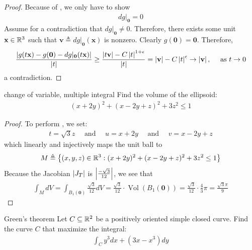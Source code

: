 \documentclass{report}
\begin{document}
\begin{proof}
 Because of , we only have to show 
\begin{align*}
dg |_\textbf{0}= 0
\end{align*}
Assume for a contradiction that $dg|_\textbf{0}\neq 0$. Therefore, there exists some unit $\textbf{x}\in\mathbb{R}^3$ such that $\textbf{v}\triangleq dg|_\textbf{0}(\textbf{x})$ is nonzero. Clearly $g(\textbf{0})=\textbf{0}$. Therefore, 
\begin{align*}
 \frac{\left|g(t\textbf{x})- g(\textbf{0})- dg|_\textbf{0}(t \textbf{x})\right|}{\left|t\right|} \geq \frac{\left|t \textbf{v}\right|- C\left|t\right|^{1+\epsilon }}{\left|t\right|} = \left|\textbf{v}\right| - C \left|t\right|^{\epsilon } \rightarrow \left|\textbf{v}\right|,\quad \text{ as }t \rightarrow 0
\end{align*}
a contradiction. 
\end{proof}
\begin{question}{change of variable, multiple integral}{}
Find the volume of the ellipsoid: 
\begin{align*}
  (x+2y)^2+ (x-2y+z)^2 +3z^2 \leq 1
\end{align*}
\end{question}
\begin{proof}
To perform , we set: 
\begin{align*}
t=\sqrt{3}z  \quad \text{ and }\quad u=x+2y \quad \text{ and }\quad v=x-2y+z
\end{align*}
which linearly and injectively maps the unit ball to
\begin{align*}
M\triangleq \left\{ (x,y,z)\in\mathbb{R}^3:(x+2y)^2 + (x-2y+z)^2 + 3z^2\leq  1 \right\}
\end{align*}
Because the Jacobian $\left|J_T\right|$ is $\left|\frac{-\sqrt{3} }{12}\right|$, we see that  
\begin{align*}
\int_M dV = \int_{B_1(\textbf{0})}  \frac{\sqrt{3}}{12}dV= \frac{\sqrt{3}}{12}\cdot \operatorname{Vol}(B_1(\textbf{0}))= \frac{\sqrt{3} }{12} \cdot \frac{4}{3} \pi = \frac{\sqrt{3} \pi }{9} 
\end{align*}
\end{proof}
\begin{question}{Green's theorem}{}
Let $C\subseteq \mathbb{R}^2$ be a positively oriented simple closed curve. Find the curve $C$ that maximize the integral: 
\begin{align}
\label{EQiC}
\int_C y^3 dx+ (3x-x^3)dy
\end{align}
\end{question}
\end{document}
